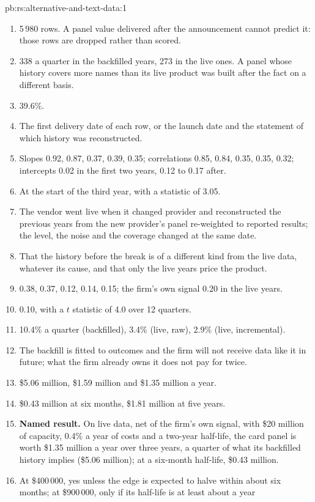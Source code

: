 \begin{solution}{pb:rs:alternative-and-text-data:1}
\begin{enumerate}
\item 5\,980 rows. A panel value delivered after the announcement cannot predict it: those rows are dropped rather than scored.
\item 338 a quarter in the backfilled years, 273 in the live ones. A panel whose history covers more names than its live product was built after
the fact on a different basis.
\item 39.6\%.
\item The first delivery date of each row, or the launch date and the statement of which history was reconstructed.
\item Slopes 0.92, 0.87, 0.37, 0.39, 0.35; correlations 0.85, 0.84, 0.35, 0.35, 0.32; intercepts 0.02 in the first two years, 0.12 to 0.17 after.
\item At the start of the third year, with a statistic of 3.05.
\item The vendor went live when it changed provider and reconstructed the previous years from the new provider's panel re-weighted to reported
results; the level, the noise and the coverage changed at the same date.
\item That the history before the break is of a different kind from the live data, whatever its cause, and that only the live years price the
product.
\item 0.38, 0.37, 0.12, 0.14, 0.15; the firm's own signal 0.20 in the live years.
\item 0.10, with a $t$ statistic of 4.0 over 12 quarters.
\item 10.4\% a quarter (backfilled), 3.4\% (live, raw), 2.9\% (live, incremental).
\item The backfill is fitted to outcomes and the firm will not receive data like it in future; what the firm already owns it does not pay for twice.
\item \$5.06 million, \$1.59 million and \$1.35 million a year.
\item \$0.43 million at six months, \$1.81 million at five years.
\item \textbf{Named result.} On live data, net of the firm's own signal, with \$20 million of capacity, 0.4\% a year of costs and a two-year
half-life, the card panel is worth \$1.35 million a year over three years, a quarter of what its backfilled history implies (\$5.06 million); at
a six-month half-life, \$0.43 million.
\item At \$400\,000, yes unless the edge is expected to halve within about six months; at \$900\,000, only if its half-life is at least about a year

\end{enumerate}
\end{solution}
